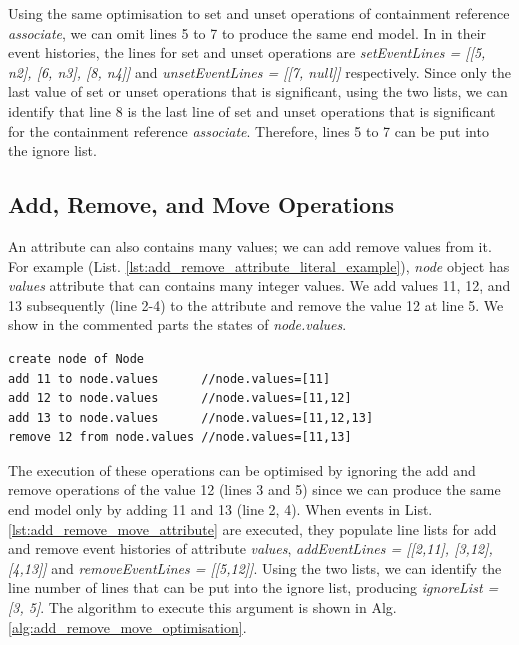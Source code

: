 \documentclass[sigconf]{acmart}
\begin{document}
Using the same optimisation to set and unset operations of containment reference \emph{associate}, we can omit lines 5 to 7 to produce the same end model. In in their event histories, the lines for set and unset operations are \emph{setEventLines = [[5, n2], [6, n3], [8, n4]]} and \emph{unsetEventLines = [[7, null]]} respectively. Since only the last value of set or unset operations that is significant, using the two lists, we can identify that line 8 is the last line of set and unset operations that is significant for the containment reference \emph{associate}. Therefore, lines 5 to 7 can be put into the ignore list.

\subsection{Add, Remove, and Move Operations}
\label{subsec:add_remove_and_move_operations}
An attribute can also contains many values; we can add remove values from it. For example (List. \ref{lst:add_remove_attribute_literal_example}), \emph{node} object has \emph{values} attribute that can contains many integer values. We add values 11, 12, and 13 subsequently (line 2-4) to the attribute and remove the value 12 at line 5. We show in the commented parts the states of \emph{node.values}.  

\begin{lstlisting}[style=eol,caption={Example of CBP representation of attribute \emph{values}'s add and remove operations.},label=lst:add_remove_move_attribute]
create node of Node
add 11 to node.values      //node.values=[11] 
add 12 to node.values      //node.values=[11,12] 
add 13 to node.values      //node.values=[11,12,13] 
remove 12 from node.values //node.values=[11,13] 
\end{lstlisting}

The execution of these operations can be optimised by ignoring the add and remove operations of the value 12 (lines 3 and 5) since we can produce the same end model only by adding 11 and 13 (line 2, 4). When events in List. \ref{lst:add_remove_move_attribute} are executed, they populate line lists for add and remove event histories of attribute \emph{values}, \emph{addEventLines = [[2,11], [3,12], [4,13]]} and \emph{removeEventLines = [[5,12]]}. Using the two lists, we can identify the line number of lines that can be put into the ignore list, producing \emph{ignoreList = [3, 5]}. The algorithm to execute this argument is shown in Alg. \ref{alg:add_remove_move_optimisation}.
\end{document}
